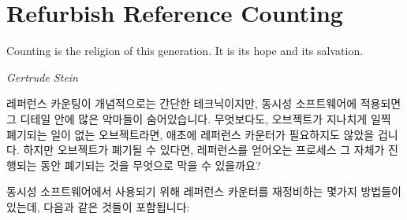 
\section{Refurbish Reference Counting}
\label{sec:together:Refurbish Reference Counting}
%
\epigraph{Counting is the religion of this generation.  It is its
	  hope and its salvation.}
	 {\emph{Gertrude Stein}}

레퍼런스 카운팅이 개념적으로는 간단한 테크닉이지만, 동시성 소프트웨어에
적용되면 그 디테일 안에 많은 악마들이 숨어있습니다.
무엇보다도, 오브젝트가 지나치게 일찍 폐기되는 일이 없는 오브젝트라면, 애초에
레퍼런스 카운터가 필요하지도 않았을 겁니다.
하지만 오브젝트가 폐기될 수 있다면, 레퍼런스를 얻어오는 프로세스 그 자체가
진행되는 동안 폐기되는 것을 무엇으로 막을 수 있을까요?

동시성 소프트웨어에서 사용되기 위해 레퍼런스 카운터를 재정비하는 몇가지
방법들이 있는데, 다음과 같은 것들이 포함됩니다:
\iffalse

Although reference counting is a conceptually simple technique,
many devils hide in the details when it is applied to concurrent
software.
After all, if the object was not subject to premature disposal,
there would be no need for the reference counter in the first place.
But if the object can be disposed of, what prevents disposal during
the reference-acquisition process itself?

There are a number of ways to refurbish reference counters for
use in concurrent software, including:
\fi

